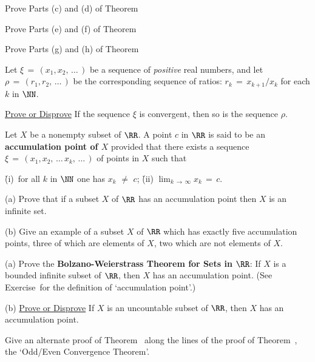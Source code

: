 \noindent \ExCg Prove Parts (c) and (d) of Theorem~ %


\V
\V

\noindent \ExCh Prove Parts (e) and (f) of Theorem~ %

\V
\V

\noindent \ExCi Prove Parts (g) and (h) of Theorem~ %

\V
\V

\noindent \ExCj Let ${\xi} \,=\, (x_{1},x_{2},\,{\ldots}\,)$ be a sequence of {\em positive} real numbers,
    and let ${\rho} \,=\, (r_{1},r_{2},\,{\ldots}\,)$ be the corresponding sequence of ratios: $r_{k} \,=\, x_{k+1}/x_{k}$ for each $k$ in ${\NN}$.

\V

        \underline{Prove or Disprove} If the sequence ${\xi}$ is convergent, then so is the sequence ${\rho}$.

\V
\V

\noindent {} Let $X$ be a nonempty subset of ${\RR}$. A point $c$ in ${\RR}$ is said to be an {\bf accumulation point of $X$} provided that there exists a sequence ${\xi} \,=\, (x_{1}, x_{2},\,{\ldots}\,x_{k},\,{\ldots}\,)$ of points in $X$ such that

        \h (i)\, for all $k$ in ${\NN}$ one has $x_{k} \,\,{\neq}\,\, c$;
        \h (ii) $\lim_{k \,{\rightarrow}\, {\infty}} x_{k} \,=\, c$.

\V

        (a) Prove that if a subset $X$ of ${\RR}$ has an accumulation point then $X$ is an infinite set.

\V

        (b) Give an example of a subset $X$ of ${\RR}$ which has exactly five accumulation points, three of which are elements of $X$, two which are not elements of $X$.

\V
\V

\noindent \ExCl (a) Prove the {\bf Bolzano-Weierstrass Theorem for Sets in ${\RR}$}:
    If $X$ is a bounded infinite subset of ${\RR}$, then $X$ has an accumulation point.
    (See Exercise~\ExCk for the definition of `accumulation point'.) 

\V

        (b) \underline{Prove or Disprove} If $X$ is an uncountable subset of ${\RR}$, then $X$ has an accumulation point.

\V
\V

\noindent \ExCm Give an alternate proof of Theorem~ along the lines of the proof of Theorem~, the `Odd/Even Convergence Theorem'. %

